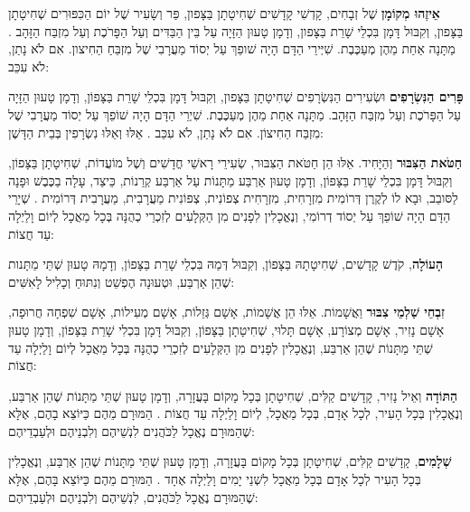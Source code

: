 \textbf{אֵיזֶהוּ מְקוֹמָן} שֶׁל זְבָחִים, קָדְשִׁי קָדָשִׁים שְׁחִיטָתָן בַּצָּפון, פַּר וְשָׂעִיר שֶׁל יוֹם הַכִּפּוּרִים שְׁחִיטָתָן בַּצָּפון, וְקִבּוּל דָּמָן בִּכְלֵי שָׁרֵת בַּצָּפון, וְדָמָן טָעוּן הַזָּיָה עַל בֵּין הַבַּדִּים וְעַל הַפָּרֹכֶת וְעַל מִזְבַּח הַזָּהָב . מַתָּנָה אַחַת מֵהֶן מְעַכֶּבֶת. שִׁיְּירֵי הַדָּם הָיָה שׁופֵךְ עַל יְסוֹד מַעֲרָבִי שֶׁל מִזְבֵּחַ הַחִיצון. אִם לֹא נָתַן, לֹא עִכֵּב:

\textbf{פָּרִים הַנִּשְׂרָפִים} וּשְׂעִירִים הַנִּשְׂרָפִים שְׁחִיטָתָן בַּצָּפון, וְקִבּוּל דָּמָן בִּכְלֵי שָׁרֵת בַּצָּפוֹן, וְדָמָן טָעוּן הַזָּיָה עַל הַפָּרֹכֶת וְעַל מִזְבַּח הַזָּהָב. מַתָּנָה אַחַת מֵהֶן מְעַכֶּבֶת. שִׁיְרֵי הַדָּם הָיָה שׁוֹפֵךְ עַל יְסוֹד מַעֲרָבִי שֶׁל מִזְבַּח הַחִיצוֹן. אִם לֹא נָתַן, לֹא עִכֵּב . אֵלּוּ וְאֵלּוּ נִשְׂרָפִין בְּבֵית הַדָּשֶׁן:

\textbf{חַטֹּאת הַצִּבּוּר} וְהַיָּחִיד. אֵלּוּ הֵן חַטֹּאת הַצִּבּוּר, שְׂעִירֵי רָאשֵׁי חֳדָשִׁים וְשֶׁל מוֹעֲדוֹת, שְׁחִיטָתָן בַּצָּפוֹן, וְקִבּוּל דָּמָן בִּכְלֵי שָׁרֵת בַּצָּפוֹן, וְדָמָן טָעוּן אַרְבַּע מַתָּנוֹת עַל אַרְבַּע קְרַנוֹת, כֵּיצַד, עָלָה בַכֶּבֶשׁ וּפָנָה לַסּובֵב, וּבָא לוֹ לְקֶרֶן דְּרוֹמִית מִזְרָחִית, מִזְרָחִית צְפוֹנִית, צְפוֹנִית מַעֲרָבִית, מַעֲרָבִית דְּרוֹמִית . שְׁיָרֵי הַדָּם הָיָה שׁוֹפֵךְ עַל יְסוֹד דְרוֹמִי, וְנֶאֱכָלִין לִפָנִים מִן הַקְּלָעִים לְזִכְרֵי כְהֻנָּה בְּכָל מַאֲכָל לְיוֹם וָלַיְלָה עַד חֲצוֹת:

\textbf{הָעוֹלָה}, קֹדֶשׁ קָדָשִׁים, שְׁחִיטָתָהּ בַּצָּפוֹן, וְקִבּוּל דְּמַהּ בִּכְלֵי שָׁרֵת בַּצָּפוֹן, וְדָמָהּ טָעוּן שְׁתֵּי מַתָּנות שֶׁהֵן אַרְבַּע, וּטְעוּנָה הֶפְשֵׁט וְנִתּוּחַ וְכָלִיל לָאִשִּׁים:

\textbf{זִבְחֵי שַׁלְמֵי צִבּוּר} וַאֲשָׁמוֹת. אֵלּוּ הֵן אֲשָׁמוֹת, אָשָׁם גְּזֵלוֹת, אָשָׁם מְעִילוֹת, אָשָׁם שִׁפְחָה חֲרוּפָה, אָשָׁם נָזִיר, אָשָׁם מְצוֹרָע, אָשָׁם תָּלוּי, שְׁחִיטָתָן בַּצָּפוֹן, וְקִבּוּל דָּמָן בִּכְלִי שָׁרֵת בַּצָּפוֹן, וְדָמָן טָעוּן שְׁתֵּי מַתָּנוֹת שֶׁהֵן אַרְבַּע, וְנֶאֱכָלִין לְפָנִים מִן הַקְּלָעִים לְזִכְרֵי כְהֻנָּה בְּכָל מַאֲכָל לְיוֹם וָלַיְלָה עַד חֲצוֹת:

\textbf{הַתּוֹדָה} וְאֵיל נָזִיר, קָדָשִׁים קַלִּים, שְׁחִיטָתָן בְּכָל מָקוֹם בָּעֲזָרָה, וְדָמָן טָעוּן שְׁתֵּי מַתָּנוֹת שֶׁהֵן אַרְבַּע, וְנֶאֱכָלִין בְּכָל הָעִיר, לְכָל אָדָם, בְּכָל מַאֲכָל, לְיוֹם וָלַיְלָה עַד חֲצוֹת . הַמּוּרָם מֵהֶם כַּיּוֹצֵא בָהֶם, אֶלָּא שֶׁהַמּוּרָם נֶאֱכָל לַכֹּהֲנִים לִנְשֵׁיהֶם וְלִבְנֵיהֶם וּלְעַבְדֵיהֶם:

\textbf{שְׁלָמִים}, קָדָשִׁים קַלִּים, שְׁחִיטָתָן בְּכָל מָקוֹם בָּעֲזָרָה, וְדָמָן טָעוּן שְׁתֵּי מַתָּנוֹת שֶׁהֵן אַרְבַּע, וְנֶאֱכָלִין בְּכָל הָעִיר לְכָל אָדָם בְּכָל מַאֲכָל לִשְׁנֵי יָמִים וָלַיְלָה אֶחָד . הַמּוּרָם מֵהֶם כַּיּוֹצֵא בָּהֶם, אֶלָּא שֶׁהַמּוּרָם נֶאֱכָל לַכֹּהֲנִים, לִנְשֵׁיהֶם וְלִבְנֵיהֶם וּלְעַבְדֵיהֶם:

